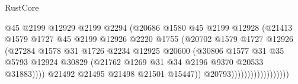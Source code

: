 \begin{lexlean}{RustCore}
\begin{coremodule}
                                        @45
                                        @2199
                                        @12929
                                        @2199
                                        @2294
                                        (@20686
                                          @1580
                                          @45
                                          @2199
                                          @12928
                                          (@21413
                                            @1579
                                            @1727
                                            @45
                                            @2199
                                            @12926
                                            @2220
                                            @1755
                                            (@20702
                                              @1579
                                              @1727
                                              @12926
                                              (@27284
                                                @1578
                                                @31
                                                @1726
                                                @2234
                                                @12925
                                                @20600
                                                (@30806
                                                  @1577
                                                  @31
                                                  @35
                                                  @5793
                                                  @12924
                                                  @30829
                                                  (@21762
                                                    @1269
                                                    @31
                                                    @34
                                                    @2196
                                                    @9370
                                                    @20533
                                                    @31883))))
                                            @21492
                                            @21495
                                            @21498
                                            @21501
                                            @15447))
                                        @20793))))))))))))))))))

\end{coremodule}
\end{lexlean}
